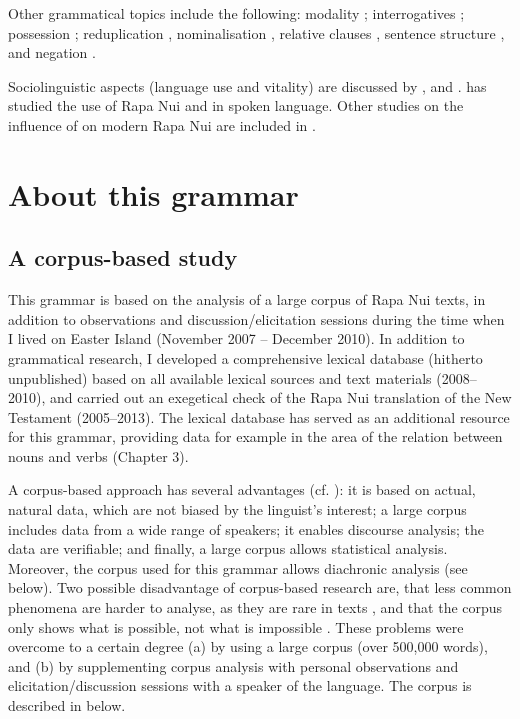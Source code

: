 Other grammatical topics include the following: modality \citep{DuFeu1994}; interrogatives \citep{DuFeu1995}; possession \citep{MulloyRapu1977}; reduplication \citep{Johnston1978}, nominalisation \citep{McAdams1980}, relative clauses \citep{Silva-Corvalán1978}, sentence structure \citep{Smith1980}, and negation \citep{Stenson1981}.

Sociolinguistic aspects (language use and vitality) are discussed by \citet{WeberWeber1984,WeberWeber1990Sobrevivir,WeberWeber1998}, \citet{GómezMacker1977,GómezMacker1979} and \citet{HaoaCardinali2012}. \citet{Makihara1998,Makihara1999,Makihara2001Changing,Makihara2001Adaptation,Makihara2004,Makihara2007,Makihara2009} has studied the use of Rapa Nui and  in spoken language. Other studies on the influence of  on modern Rapa Nui are included in \citet{StolzBakker2008}. 

\section{About this grammar}\label{sec:1.6}
\subsection{A corpus-based study}\label{sec:1.6.1}

This grammar is based on the analysis of a large corpus of Rapa Nui texts, in addition to observations and discussion/elicitation sessions during the time when I lived on Easter Island (November 2007 – December 2010). In addition to grammatical research, I developed a comprehensive lexical database (hitherto unpublished) based on all available lexical sources and text materials (2008–2010), and carried out an exegetical check of the Rapa Nui translation of the New Testament (2005–2013). The lexical database has served as an additional resource for this grammar, providing data for example in the area of the relation between nouns and verbs (Chapter 3).

A corpus-based approach has several advantages (cf. \citealt[12]{McEneryWilson1996}): it is based on actual, natural data, which are not biased by the linguist’s interest; a large corpus includes data from a wide range of speakers; it enables discourse analysis; the data are verifiable; and finally, a large corpus allows statistical analysis. Moreover, the corpus used for this grammar allows diachronic analysis (see below). Two possible disadvantage of corpus-based research are, that less common phenomena are harder to analyse, as they are rare in texts \citep{Chapin1978}, and that the corpus only shows what is possible, not what is impossible \citep[412]{Biggs1974}. These problems were overcome to a certain degree (a) by using a large corpus (over 500,000 words), and (b) by supplementing corpus analysis with personal observations and elicitation/discussion sessions with a speaker of the language. The corpus is described in  below.

